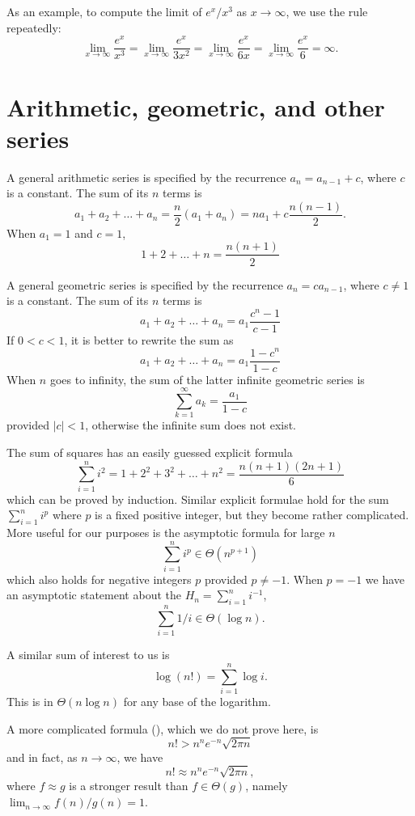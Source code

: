 As an example, to compute the limit of $e^x/x^3$ as $x\to \infty$, we use 
the rule repeatedly:
$$
\lim_{x\to\infty} \frac{e^x}{x^3} = \lim_{x\to\infty} \frac{e^x}{3x^2} = 
\lim_{x\to\infty} \frac{e^x}{6x} = \lim_{x\to\infty} \frac{e^x}{6} = \infty.
$$

\section{Arithmetic, geometric, and other series}
\label{sec:app:sum:series}

A general arithmetic series is specified by the recurrence
\(a_n = a_{n-1} + c\), where \(c\) is a constant. The sum of
its \(n\) terms is
\[
a_{1}+a_{2}+\ldots+a_{n} = \frac{n}{2}(a_1 + a_n ) =
na_1 + c\frac{n(n-1)}{2}.
\] 
When \(a_1=1\) and \(c=1\), 
\[
1 + 2 + \dots + n = \frac{n(n+1)}{2}
\]

A general geometric series is specified by the recurrence
\(a_n = ca_{n-1}\), where \(c \ne 1\) is a constant. The
sum of its \(n\) terms is
\[
a_{1}+a_{2}+\ldots+a_{n} = a_1 \frac{c^n - 1}{c - 1}
\]
If \(0 < c < 1\), it is better to rewrite the sum as
\[
a_{1}+a_{2}+\ldots+a_{n} = a_1 \frac{1 - c^n}{1-c}
\]
When \(n\) goes to infinity, the sum of the latter
infinite geometric series is
\[
\sum\limits_{k=1}^{\infty}a_k = \frac{a_1}{1-c}
\]
provided $|c| < 1$, otherwise the infinite sum does not exist.

The sum of squares has an easily guessed explicit formula
\[
\sum_{i=1}^n i^2 = 1 + 2^2 + 3^2 + \ldots + n^2 = \frac{n(n+1)(2n+1)}{6}
\]
which can be proved by induction.
Similar explicit formulae hold for the sum $\sum_{i=1}^n i^p$ where $p$
is a fixed positive integer, but they become rather complicated. More
useful for our purposes is the asymptotic formula for large $n$
\[
\sum_{i=1}^n i^p \in \Theta(n^{p+1})
\]
which also holds for negative integers $p$ 
provided $p\neq -1$. When $p= -1 $ we have an asymptotic statement about 
the  $H_n = \sum_{i=1}^n i^{-1}$,
\[
\sum_{i=1}^n 1/i  \in \Theta(\log n).
\] 

A similar sum of interest to us is $$\log(n!) = \sum_{i=1}^n \log
i.$$ This is in $\Theta(n\log n)$ for any base of the logarithm.


A more complicated formula (),
which we do not prove here, is
$$n! > n^n e^{-n} \sqrt{2 \pi n}$$
and in fact, as $n\to \infty$, we have
$$ n! \approx n^n e^{-n} \sqrt{2 \pi n},$$ 
where $f \approx g$ is a stronger result than $f\in \Theta(g)$, namely 
$\lim_{n\to \infty} f(n)/g(n) = 1$.

